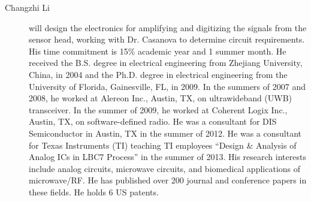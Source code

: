 \begin{description}
  \item[Changzhi Li] will design the electronics for amplifying and digitizing the signals from the sensor head, working with Dr. Casanova to determine circuit requirements. His time commitment is 15\% academic year and 1 summer month. He received the B.S. degree in electrical engineering from Zhejiang University, China, in 2004 and the Ph.D. degree in electrical engineering from the University of Florida, Gainesville, FL, in 2009. In the summers of 2007 and 2008, he worked at Alereon Inc., Austin, TX, on ultrawideband (UWB) transceiver. In the summer of 2009, he worked at Coherent Logix Inc., Austin, TX, on software-defined radio. He was a consultant for DIS Semiconductor in Austin, TX in the summer of 2012. He was a consultant for Texas Instruments (TI) teaching TI employees “Design & Analysis of Analog ICs in LBC7 Process” in the summer of 2013. His research interests include analog circuits, microwave circuits, and biomedical applications of microwave/RF. He has published over 200 journal and conference papers in these fields. He holds 6 US patents.
\end{description}


